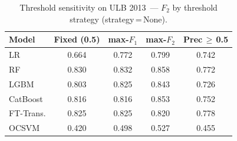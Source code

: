 \begin{table}[ht!]
\centering
\caption{Threshold sensitivity on ULB 2013~--- $F_2$ by threshold strategy (strategy\,=\,None).}
\label{tab:threshold_ulb_f2}
\begin{tabular}{l c c c c}
\toprule
Model & Fixed (0.5) & max-$F_1$ & max-$F_2$ & Prec\,$\geq$\,0.5 \\
\midrule
LR         & 0.664 & 0.772 & 0.799 & 0.742 \\
RF         & 0.830 & 0.832 & 0.858 & 0.772 \\
LGBM       & 0.803 & 0.825 & 0.843 & 0.726 \\
CatBoost   & 0.816 & 0.816 & 0.853 & 0.752 \\
FT-Trans.  & 0.825 & 0.825 & 0.820 & 0.778 \\
OCSVM      & 0.420 & 0.498 & 0.527 & 0.455 \\
\bottomrule
\end{tabular}
\end{table}